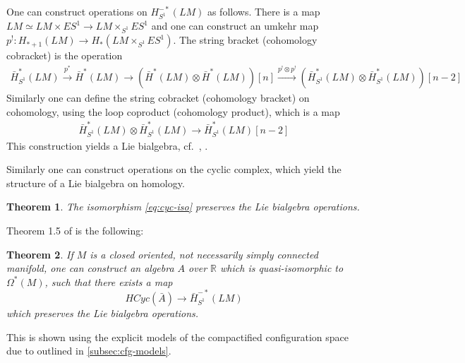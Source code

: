 \documentclass{scrartcl}
\theoremstyle{plain}
\newtheorem{theorem}{Theorem}[section]
\theoremstyle{definition}
\newcommand{\R}{\mathbb R}
\newcommand{\quiso}{\simeq}
\newcommand{\defeq}{\coloneqq}
\let\xto\xrightarrow
\DeclareMathOperator{\Conf}{Conf}
\begin{document}
One can construct operations on $H^{-*}_{S^1}(LM)$ as follows. There is a map $LM \quiso LM\times ES^1\to LM\times_{S^1} ES^1$ and one can construct an umkehr map $p^!\colon H_{*+1}(LM) \to H_*(LM\times_{S^1} ES^1)$. The string bracket (cohomology cobracket) is the operation 
\begin{align*}
    \bar H^*_{S^1}(LM)\xto{p^*} \bar H^*(LM)\to (\bar H^*(LM) \otimes \bar H^*(LM))[n] \xto{p^!\otimes p^!} (\bar H_{S^1}^*(LM)\otimes \bar H_{S^1}^*(LM))[n-2]
\end{align*}
Similarly one can define the string cobracket (cohomology bracket) on cohomology, using the loop coproduct (cohomology product), which is a map
\begin{align*}
    \bar H^*_{S^1}(LM)\otimes \bar H^*_{S^1}(LM) \to \bar H^*_{S^1}(LM)[n-2]
\end{align*}
This construction yields a Lie bialgebra, cf.~\cite{chas1999string}, \cite{chas2004closed}. 

Similarly one can construct operations on the cyclic complex, which yield the structure of a Lie bialgebra on homology. 
\begin{theorem} The isomorphism \ref{eq:cyc-iso} preserves the Lie bialgebra operations. 
\end{theorem}

Theorem 1.5 of \cite{naef2019string} is the following: 
\begin{theorem}
    If $M$ is a closed oriented, not necessarily simply connected manifold, one can construct an algebra $A$ over $\R$ which is quasi-isomorphic to $\Omega^*(M)$, such that there exists a map 
    \begin{equation}HCyc(\bar A) \to \bar H^{-*}_{S^1}(LM)\end{equation}
    which preserves the Lie bialgebra operations.
\end{theorem}
This is shown using the explicit models of the compactified configuration space due to \cite{campos2016model} outlined in \cref{subsec:cfg-models}. 






\end{document}
